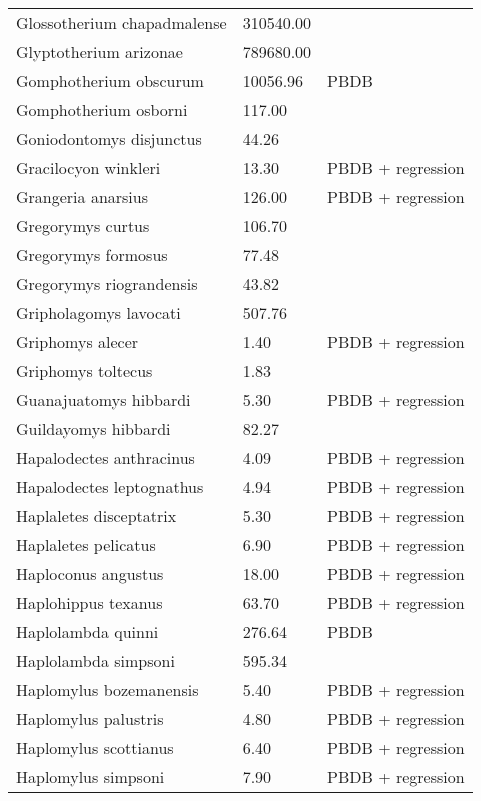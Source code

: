 \documentclass{article}
\begin{document}
\begin{center}
\begin{longtable}{p{} p{} p{}}
    Glossotherium chapadmalense & 310540.00 & \cite{McDonald2005} \\ 
    Glyptotherium arizonae & 789680.00 & \cite{McDonald2005} \\ 
    Gomphotherium obscurum & 10056.96 & PBDB \\ 
    Gomphotherium osborni & 117.00 & \cite{Wang2014} \\ 
    Goniodontomys disjunctus & 44.26 & \cite{Tomiya2013} \\ 
    Gracilocyon winkleri & 13.30 & PBDB + regression \\ 
    Grangeria anarsius & 126.00 & PBDB + regression \\ 
    Gregorymys curtus & 106.70 & \cite{Tomiya2013} \\ 
    Gregorymys formosus & 77.48 & \cite{Tomiya2013} \\ 
    Gregorymys riograndensis & 43.82 & \cite{Tomiya2013} \\ 
    Gripholagomys lavocati & 507.76 & \cite{Tomiya2013} \\ 
    Griphomys alecer & 1.40 & PBDB + regression \\ 
    Griphomys toltecus & 1.83 & \cite{Mihlbachler2006} \\ 
    Guanajuatomys hibbardi & 5.30 & PBDB + regression \\ 
    Guildayomys hibbardi & 82.27 & \cite{Tomiya2013} \\ 
    Hapalodectes anthracinus & 4.09 & PBDB + regression \\ 
    Hapalodectes leptognathus & 4.94 & PBDB + regression \\ 
    Haplaletes disceptatrix & 5.30 & PBDB + regression \\ 
    Haplaletes pelicatus & 6.90 & PBDB + regression \\ 
    Haploconus angustus & 18.00 & PBDB + regression \\ 
    Haplohippus texanus & 63.70 & PBDB + regression \\ 
    Haplolambda quinni & 276.64 & PBDB \\ 
    Haplolambda simpsoni & 595.34 & \cite{Tedford1994} \\ 
    Haplomylus bozemanensis & 5.40 & PBDB + regression \\ 
    Haplomylus palustris & 4.80 & PBDB + regression \\ 
    Haplomylus scottianus & 6.40 & PBDB + regression \\ 
    Haplomylus simpsoni & 7.90 & PBDB + regression \\ 

\end{longtable}
\end{center}
\end{document}
